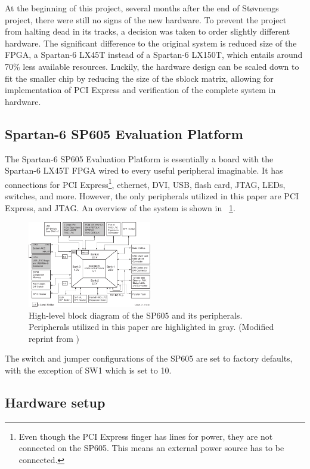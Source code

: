 At the beginning of this project, several months after the end of Støvnengs project, there were still no signs of the new hardware.
To prevent the project from halting dead in its tracks, a decision was taken to order slightly different hardware.
The significant difference to the original system is reduced size of the FPGA, a Spartan-6 LX45T instead of a Spartan-6 LX150T, which entails around 70\% less available resources.
Luckily, the hardware design can be scaled down to fit the smaller chip by reducing the size of the sblock matrix, allowing for implementation of PCI Express and verification of the complete system in hardware.

\subsection{Spartan-6 SP605 Evaluation Platform}

The Spartan-6 SP605 Evaluation Platform is essentially a board with the Spartan-6 LX45T FPGA wired to every useful peripheral imaginable.
It has connections for PCI Express\footnote{
        Even though the PCI Express finger has lines for power, they are not connected on the SP605. This means an external power source has to be connected.
    }, ethernet, DVI, USB, flash card, JTAG, LEDs, switches, and more.
However, the only peripherals utilized in this paper are PCI Express, and JTAG.
An overview of the system is shown in \figurename~\ref{fig:sp605}.

\begin{figure}[!ht]
    \centering
    \includegraphics[width=0.48\textwidth]{figures/sp605-modified}
    \caption{High-level block diagram of the SP605 and its peripherals. Peripherals utilized in this paper are highlighted in gray. (Modified reprint from \cite{ug526})}
    \label{fig:sp605}
\end{figure}

The switch and jumper configurations of the SP605 are set to factory defaults, with the exception of SW1 which is set to 10.

\subsection{Hardware setup}

